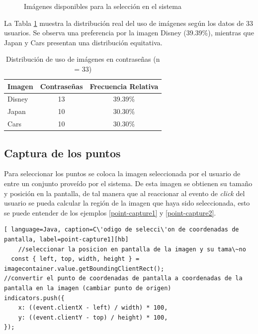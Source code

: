 \begin{figure}[ht]
	\caption{Imágenes disponibles para la selección en el sistema}
	\label{fig:imagenes-sistema}
\end{figure}

La Tabla \ref{tab:uso-imagenes} muestra la distribución real del uso de imágenes según los datos de 33 usuarios. Se observa una preferencia por la imagen Disney (39.39\%), mientras que Japan y Cars presentan una distribución equitativa.


\begin{table}[ht]
	\centering
	\caption{Distribución de uso de imágenes en contraseñas (n = 33)}
	\label{tab:uso-imagenes}
	\begin{tabularx}{0.8\textwidth}{Xcc}
		\toprule
		\textbf{Imagen} & \textbf{Contraseñas} & \textbf{Frecuencia Relativa} \\
		\midrule
		Disney & 13 & 39.39\% \\
		Japan & 10 & 30.30\% \\
		Cars & 10 & 30.30\% \\
		\bottomrule
	\end{tabularx}
	\vspace{0.2cm}

\end{table}



\subsection{Captura de los puntos}
Para seleccionar los puntos se coloca la imagen seleccionada por el usuario de entre un conjunto prove\'ido por el sistema. De esta imagen se obtienen su tama\~no y posici\'on en la pantalla, de tal manera que al reaccionar al evento de \textit{click} del usuario se pueda calcular la regi\'on de la imagen que haya sido seleccionada, esto se puede entender de los ejemplos \ref{point-capture1} y \ref{point-capture2}. \\

\begin{lstlisting}[ language=Java, caption=C\'odigo de selecci\'on de coordenadas de pantalla, label=point-capture1][hb]
	//seleccionar la posicion en pantalla de la imagen y su tama\~no
  const { left, top, width, height } =
imagecontainer.value.getBoundingClientRect();
//convertir el punto de coordenadas de pantalla a coordenadas de la pantalla en la imagen (cambiar punto de origen)
indicators.push({
	x: ((event.clientX - left) / width) * 100,
	y: ((event.clientY - top) / height) * 100,
});
\end{lstlisting}


